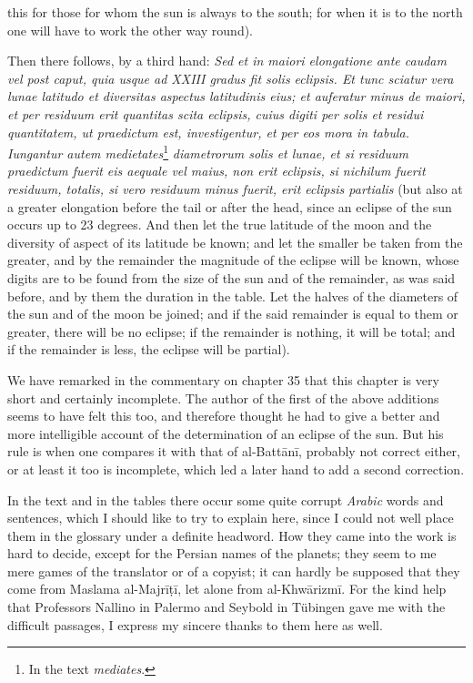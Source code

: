 \documentclass[11pt]{article}
\newcommand{\Pg}[1]{\marginpar{\footnotesize\color{gray}#1}}
\begin{document}
this for those for whom the sun is always to the south; for when it is to the north one will have to work the other way round).\par
\par Then there follows, by a third hand: \emph{Sed et in maiori elongatione ante caudam vel post caput, quia usque ad XXIII gradus fit solis eclipsis. Et tunc sciatur vera lunae latitudo et diversitas aspectus latitudinis eius; et auferatur minus de maiori, et per residuum erit quantitas scita eclipsis, cuius digiti per solis et residui quantitatem, ut praedictum est, investigentur, et per eos mora in tabula. Iungantur autem medietates}\footnote{In the text \emph{mediates}.} \emph{diametrorum solis et lunae, et si residuum praedictum fuerit eis aequale vel maius, non erit eclipsis, si nichilum fuerit residuum, totalis, si vero residuum minus fuerit, erit eclipsis partialis} (but also at a greater elongation before the tail or after the head, since an eclipse of the sun occurs up to 23 degrees. And then let the true latitude of the moon and the diversity of aspect of its latitude be known; and let the smaller be taken from the greater, and by the remainder the magnitude of the eclipse will be known, whose digits are to be found from the size of the sun and of the remainder, as was said before, and by them the duration in the table. Let the halves of the diameters of the sun and of the moon be joined; and if the said remainder is equal to them or greater, there will be no eclipse; if the remainder is nothing, it will be total; and if the remainder is less, the eclipse will be partial).\par
\par We have remarked in the commentary on chapter 35 that this chapter is very short and certainly incomplete. The author of the first of the above additions seems to have felt this too, and therefore thought he had to give a better and more intelligible account of the determination of an eclipse of the sun. But his rule is \Pg{XXI}when one compares it with that of al-Battānī, probably not correct either, or at least it too is incomplete, which led a later hand to add a second correction.\par
\par In the text and in the tables there occur some quite corrupt \emph{Arabic} words and sentences, which I should like to try to explain here, since I could not well place them in the glossary under a definite headword. How they came into the work is hard to decide, except for the Persian names of the planets; they seem to me mere games of the translator or of a copyist; it can hardly be supposed that they come from Maslama al-Majrīṭī, let alone from al-Khwārizmī. For the kind help that Professors Nallino in Palermo and Seybold in Tübingen gave me with the difficult passages, I express my sincere thanks to them here as well.\par
\end{document}
